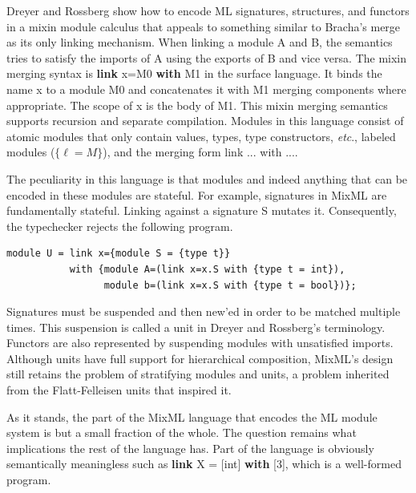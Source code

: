 		Dreyer and Rossberg \cite{mixml} show how to encode ML signatures, structures, and functors in a mixin module calculus that appeals to something similar to Bracha's merge\cite{bracha:thesis} as its only linking mechanism. When linking a module A and B, the semantics tries to satisfy the imports of A using the exports of B and vice versa. The mixin merging syntax is {\bf link} x=M0 {\bf with} M1 in the surface language. It binds the name x to a module M0 and concatenates it with M1 merging components where appropriate. The scope of x is the body of M1. This mixin merging semantics supports recursion and separate compilation. Modules in this language consist of atomic modules that only contain values, types, type constructors, {\it etc}., labeled modules ($\{\ell = M\}$), and the merging form link ... with ....  

The peculiarity in this language is that modules and indeed anything that can be encoded in these modules are stateful. For example, signatures in MixML are fundamentally stateful. Linking against a signature S mutates it. Consequently, the typechecker rejects the following program. 
\begin{lstlisting}
module U = link x={module S = {type t}} 
           with {module A=(link x=x.S with {type t = int}), 
                 module b=(link x=x.S with {type t = bool})};		
\end{lstlisting}
Signatures must be suspended and then new'ed in order to be matched multiple times. This suspension is called a unit in Dreyer and Rossberg's terminology. Functors are also represented by suspending modules with unsatisfied imports. Although units have full support for hierarchical composition, MixML's design still retains the problem of stratifying modules and units, a problem inherited from the Flatt-Felleisen units that inspired it. 

	As it stands, the part of the MixML language that encodes the ML module system is but a small fraction of the whole. The question remains what implications the rest of the language has. Part of the language is obviously semantically meaningless such as {\bf link} X = [int] {\bf with} [3], which is a well-formed program. 

